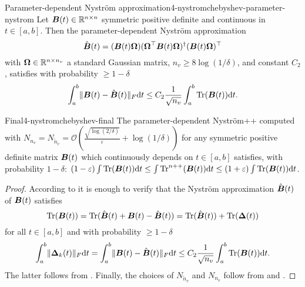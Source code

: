 \begin{lemma}{Parameter-dependent Nystr\"om approximation}{4-nystromchebyshev-parameter-nystrom}
    Let $\boldsymbol{B}(t) \in \mathbb{R}^{n \times n}$ symmetric positive definite and continuous in $t \in [a, b]$. Then the parameter-dependent Nystr\"om approximation
    \begin{equation}
        \hat{\boldsymbol{B}}(t) = (\boldsymbol{B}(t) \boldsymbol{\Omega}) (\boldsymbol{\Omega}^{\top} \boldsymbol{B}(t) \boldsymbol{\Omega})^{\dagger} (\boldsymbol{B}(t) \boldsymbol{\Omega})^{\top}
    \end{equation}
    with $\boldsymbol{\Omega} \in \mathbb{R}^{n \times n_v}$ a standard Gaussian matrix, $n_v \geq 8 \log(1/\delta)$, and constant $C_2$, satisfies with probability $\geq 1 - \delta$
    \begin{equation}
        \int_{a}^{b} \lVert \boldsymbol{B}(t) - \hat{\boldsymbol{B}}(t) \rVert _F \mathrm{d}t \leq C_2 \frac{1}{\sqrt{n_v}} \int_{a}^{b} \operatorname{Tr}(\boldsymbol{B}(t)) \mathrm{d}t.
    \end{equation}
\end{lemma}

\begin{theorem}{Final}{4-nystromchebyshev-final}
    The parameter-dependent Nystr\"om++ computed with $N_{n_v} = N_{\widetilde{n}_v} = \mathcal{O}\left( \frac{\sqrt{\log(2/\delta)}}{\varepsilon} + \log(1/\delta) \right)$ for any symmetric positive definite matrix $\boldsymbol{B}(t)$ which continuously depends on $t \in [a, b]$ satisfies, with probability $1 - \delta$: $(1 - \varepsilon) \int \operatorname{Tr}(\boldsymbol{B}(t)) \mathrm{d}t \leq \int \operatorname{Tr}^{n++}(\boldsymbol{B}(t)) \mathrm{d}t \leq  (1 + \varepsilon) \int \operatorname{Tr}(\boldsymbol{B}(t)) \mathrm{d}t$.
\end{theorem}

\begin{proof}
    According to  it is enough to verify that the Nystr\"om approximation $\hat{\boldsymbol{B}}(t)$ of $\boldsymbol{B}(t)$ satisfies
    \begin{equation}
        \operatorname{Tr}(\boldsymbol{B}(t)) = \operatorname{Tr}(\hat{\boldsymbol{B}}(t) + \boldsymbol{B}(t) - \hat{\boldsymbol{B}}(t)) = \operatorname{Tr}(\hat{\boldsymbol{B}}(t)) + \operatorname{Tr}(\boldsymbol{\Delta}(t))
    \end{equation}
    for all $t \in [a, b]$ and with probability $\geq 1 - \delta$
    \begin{equation}
        \int_{a}^{b} \lVert \boldsymbol{\Delta}_k(t) \rVert _F \mathrm{d}t = \int_{a}^{b} \lVert \boldsymbol{B}(t) - \hat{\boldsymbol{B}}(t) \rVert _F \mathrm{d}t \leq C_2 \frac{1}{\sqrt{n_v}} \int_{a}^{b} \operatorname{Tr}(\boldsymbol{B}(t)) \mathrm{d}t.
    \end{equation}
    The latter follows from . Finally, the choices of $N_{\widetilde{n}_v}$ and $N_{n_v}$ follow from  and .
\end{proof}

